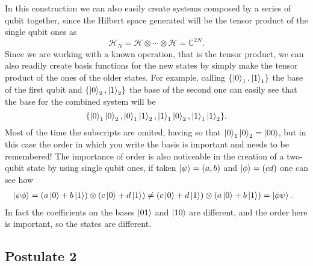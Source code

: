 In this construction we can also easily create systems composed by a series of qubit together, since the Hilbert space generated will be the tensor product of the single qubit ones as 
\begin{displaymath}
    \mathcal{H}_N = \mathcal{H} \otimes \cdots \otimes \mathcal{H} = \mathbb{C}^{2N}. 
\end{displaymath}
Since we are working with a known operation, that is the tensor product, we can also readily create basis functions for the new states by simply make the tensor product of the ones of the older states. For example, calling $\{\ket{0}_1, \ket{1}_1\}$ the base of the first qubit and $\{\ket{0}_2, \ket{1}_2\}$ the base of the second one can easily see that the base for the combined system will be 
\begin{displaymath}
    \{\ket{0}_1\ket{0}_2,\ket{0}_1\ket{1}_2, \ket{1}_1\ket{0}_2, \ket{1}_1\ket{1}_2 \}.
\end{displaymath}
Most of the time the subscripts are omited, having so that $\ket{0}_1\ket{0}_2 = \ket{00}$, but in this case the order in which you write the basis is important and needs to be remembered! The importance of order is also noticeable in the creation of a two-qubit state by using single qubit ones, if taken $\ket{\psi} = (a,b)$ and $\ket{\phi} = (cd)$ one can see how
\begin{align*}
    &\ket{\psi\phi} = \left(a\ket{0} + b\ket{1}\right)\otimes\left( c\ket{0} + d\ket{1} \right) \neq \left(c\ket{0} + d\ket{1}\right)\otimes\left( a\ket{0} + b\ket{1} \right) =  \ket{\phi\psi}.
\end{align*}
In fact the coefficients on the bases $\ket{01}$ and $\ket{10}$ are different, and the order here is important, so the states are different.


\subsection{Postulate 2}

